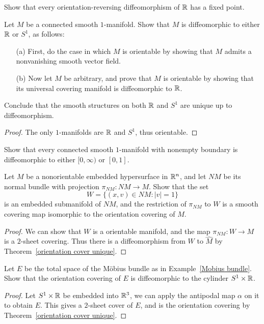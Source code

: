 \begin{exercise}
Show that every orientation-reversing diffeomorphism of $\mathbb{R}$ has a fixed
point.
\end{exercise}
\begin{exercise}
Let $M$ be a connected smooth $1$-manifold. Show that $M$ is diffeomorphic to either $\mathbb{R}$ or $S^1$, as follows:
\begin{itemize}
\item[(a)] First, do the case in which $M$ is orientable by showing that $M$ admits a nonvanishing smooth vector field.
\item[(b)] Now let $M$ be arbitrary, and prove that $M$ is orientable by showing that its universal covering manifold is diffeomorphic to $\mathbb{R}$.
\end{itemize}
Conclude that the smooth structures on both $\mathbb{R}$ and $S^1$ are unique up to
diffeomorphism.
\end{exercise}
\begin{proof}
The only $1$-manifolds are $\mathbb{R}$ and $S^1$, thus orientable.
\end{proof}
\begin{exercise}
Show that every connected smooth $1$-manifold with nonempty boundary is diffeomorphic to either $[0,\infty)$ or $[0,1]$.
\end{exercise}
\begin{exercise}
Let $M$ be a nonorientable embedded hypersurface in $\mathbb{R}^n$, and let $NM$ be
its normal bundle with projection $\pi_{NM}:NM\to M$. Show that the set
\[W=\{(x,v)\in NM:|v|=1\}\]
is an embedded submanifold of $NM$, and the restriction of $\pi_{NM}$ to $W$ is a smooth covering map isomorphic to the orientation covering of $M$.
\end{exercise}
\begin{proof}
We can show that $W$ is a orientable manifold, and the map $\pi_{NM}:W\to M$ is a $2$-sheet covering. Thus there is a diffeomorphism from $W$ to $\widehat{M}$ by Theorem~\ref{orientation cover unique}.
\end{proof}
\begin{exercise}
Let $E$ be the total space of the M\"obius bundle as in Example~\ref{Mobius bundle}. Show that the orientation covering of $E$ is diffeomorphic to the cylinder $S^1\times\mathbb{R}$.
\end{exercise}
\begin{proof}
Let $S^1\times\mathbb{R}$ be embedded into $\mathbb{R}^3$, we can apply the antipodal map $\alpha$ on it to obtain $E$. This gives a $2$-sheet cover of $E$, and is the orientation covering by Theorem~\ref{orientation cover unique}.
\end{proof}
